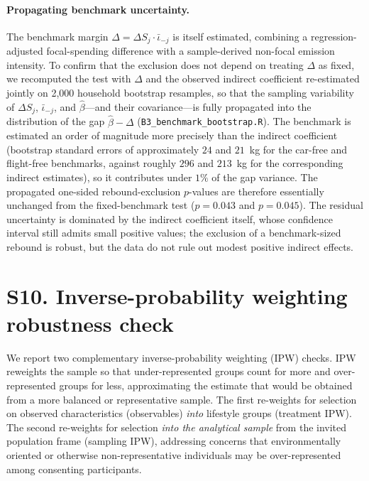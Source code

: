 \documentclass[12pt]{article}
\begin{document}
\paragraph{Propagating benchmark uncertainty.}
The benchmark margin $\Delta = \Delta S_j \cdot \bar{\iota}_{-j}$ is itself estimated, combining a regression-adjusted focal-spending difference with a sample-derived non-focal emission intensity. To confirm that the exclusion does not depend on treating $\Delta$ as fixed, we recomputed the test with $\Delta$ and the observed indirect coefficient re-estimated jointly on 2{,}000 household bootstrap resamples, so that the sampling variability of $\Delta S_j$, $\bar{\iota}_{-j}$, and $\hat\beta$---and their covariance---is fully propagated into the distribution of the gap $\hat\beta - \Delta$ (\texttt{B3\_benchmark\_bootstrap.R}). The benchmark is estimated an order of magnitude more precisely than the indirect coefficient (bootstrap standard errors of approximately $24$ and $21$~kg for the car-free and flight-free benchmarks, against roughly $296$ and $213$~kg for the corresponding indirect estimates), so it contributes under $1\%$ of the gap variance. The propagated one-sided rebound-exclusion $p$-values are therefore essentially unchanged from the fixed-benchmark test ($p=0.043$ and $p=0.045$). The residual uncertainty is dominated by the indirect coefficient itself, whose confidence interval still admits small positive values; the exclusion of a benchmark-sized rebound is robust, but the data do not rule out modest positive indirect effects.

\section*{S10. Inverse-probability weighting robustness check}

We report two complementary inverse-probability weighting (IPW) checks. IPW reweights the sample so that under-represented groups count for more and over-represented groups for less, approximating the estimate that would be obtained from a more balanced or representative sample. The first re-weights for selection on observed characteristics (observables) \emph{into} lifestyle groups (treatment IPW). The second re-weights for selection \emph{into the analytical sample} from the invited population frame (sampling IPW), addressing concerns that environmentally oriented or otherwise non-representative individuals may be over-represented among consenting participants.
\end{document}
